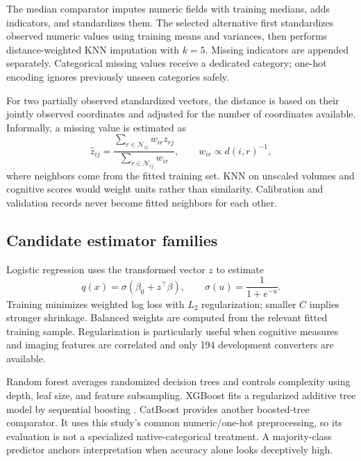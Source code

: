 \documentclass[11pt,a4paper]{article}
\begin{document}
The median comparator imputes numeric fields with training medians, adds indicators, and standardizes them. The selected alternative first standardizes observed numeric values using training means and variances, then performs distance-weighted KNN imputation with $k=5$. Missing indicators are appended separately. Categorical missing values receive a dedicated category; one-hot encoding ignores previously unseen categories safely.

For two partially observed standardized vectors, the distance is based on their jointly observed coordinates and adjusted for the number of coordinates available. Informally, a missing value is estimated as
\begin{equation}\widehat z_{ij}=\frac{\sum_{r\in\mathcal N_{ij}}w_{ir}z_{rj}}{\sum_{r\in\mathcal N_{ij}}w_{ir}},\qquad w_{ir}\propto d(i,r)^{-1},\end{equation}
where neighbors come from the fitted training set. KNN on unscaled volumes and cognitive scores would weight units rather than similarity. Calibration and validation records never become fitted neighbors for each other.
\subsection{Candidate estimator families}
Logistic regression uses the transformed vector $z$ to estimate
\begin{equation}q(x)=\sigma(\beta_0+z^\top\beta),\qquad \sigma(u)=\frac{1}{1+e^{-u}}.\end{equation}
Training minimizes weighted log loss with $L_2$ regularization; smaller $C$ implies stronger shrinkage. Balanced weights are computed from the relevant fitted training sample. Regularization is particularly useful when cognitive measures and imaging features are correlated and only 194 development converters are available.

Random forest averages randomized decision trees and controls complexity using depth, leaf size, and feature subsampling. XGBoost fits a regularized additive tree model by sequential boosting \cite{xgb}. CatBoost provides another boosted-tree comparator. It uses this study's common numeric/one-hot preprocessing, so its evaluation is not a specialized native-categorical treatment. A majority-class predictor anchors interpretation when accuracy alone looks deceptively high.

\clearpage
\end{document}
